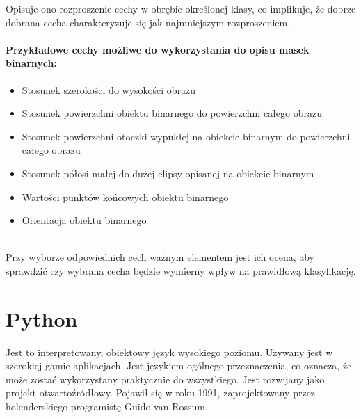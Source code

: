 \documentclass[a4paper,12pt,twoside,openany]{report}
\begin{document}
Opisuje ono rozproszenie cechy w obrębie określonej klasy, co implikuje, że dobrze dobrana cecha charakteryzuje się jak najmniejszym rozproszeniem.

\paragraph{Przykładowe cechy możliwe do wykorzystania do opisu masek binarnych: }
\begin{itemize}
	\item Stosunek szerokości do wysokości obrazu
	\item Stosunek powierzchni obiektu binarnego do powierzchni całego obrazu
	\item Stosunek powierzchni otoczki wypukłej na obiekcie binarnym do powierzchni całego obrazu
	\item Stosunek półosi małej do dużej elipsy opisanej na obiekcie binarnym 
	\item Wartości punktów końcowych obiektu binarnego
	\item Orientacja obiektu binarnego
\end{itemize}
\mbox{} \\
Przy wyborze odpowiednich cech ważnym elementem jest ich ocena, aby sprawdzić czy wybrana cecha będzie wymierny wpływ na prawidłową klasyfikację.

\section{Python}
Jest to interpretowany, obiektowy język wysokiego poziomu. Używany jest w szerokiej gamie  aplikacjach. Jest językiem ogólnego przeznaczenia, co oznacza, że może zostać wykorzystany praktycznie do wszystkiego. Jest rozwijany jako projekt otwartoźródłowy. Pojawił się w roku 1991, zaprojektowany przez holenderskiego programistę Guido van Rossum.
\end{document}
